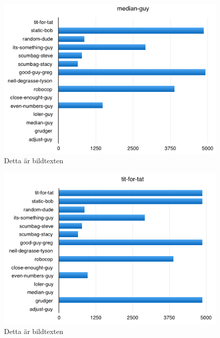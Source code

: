 \begin{figure}[htb]
	\begin{center}
	\includegraphics[scale=0.75, angle=0]{bilder/median-guy.png}
	\caption{Detta är bildtexten}
	\label{median-guy}
	\end{center}
\end{figure}

\begin{figure}[htb]
	\begin{center}
	\includegraphics[scale=0.75, angle=0]{bilder/tit-for-tat.png}
	\caption{Detta är bildtexten}
	\label{tit-for-tat}
	\end{center}
\end{figure}